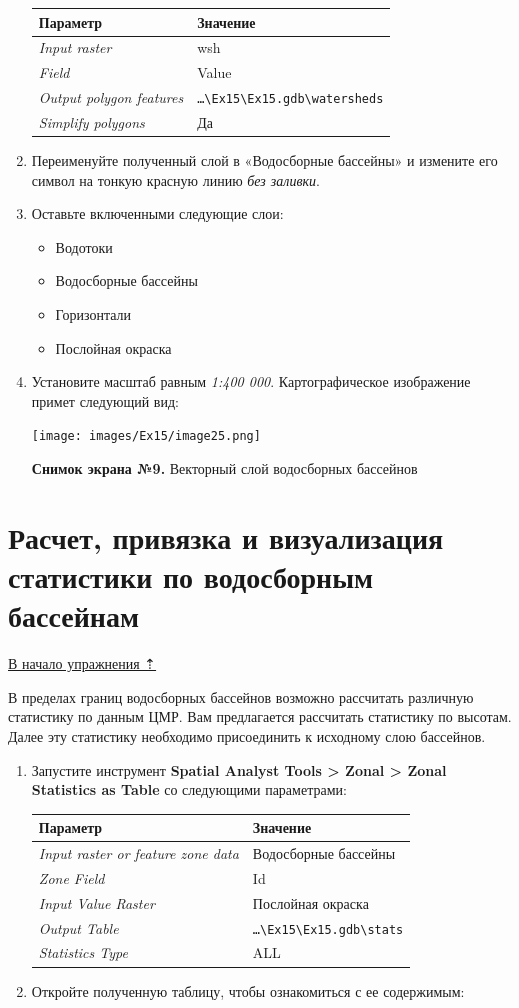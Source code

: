 \documentclass[12pt,]{book}
\providecommand{\tightlist}{%
  \setlength{\itemsep}{0pt}\setlength{\parskip}{0pt}}
\begin{document}
\begin{enumerate}
  \begin{longtable}[]{@{}ll@{}}
  \toprule
  Параметр & Значение\tabularnewline
  \midrule
  \endhead
  \emph{Input raster} & wsh\tabularnewline
  \emph{Field} & Value\tabularnewline
  \emph{Output polygon features} & \texttt{\ldots{}\textbackslash{}Ex15\textbackslash{}Ex15.gdb\textbackslash{}watersheds}\tabularnewline
  \emph{Simplify polygons} & Да\tabularnewline
  \bottomrule
  \end{longtable}
\item
  Переименуйте полученный слой в «Водосборные бассейны» и измените его символ на тонкую красную линию \emph{без заливки}.
\item
  Оставьте включенными следующие слои:

  \begin{itemize}
  \tightlist
  \item
    Водотоки
  \item
    Водосборные бассейны
  \item
    Горизонтали
  \item
    Послойная окраска
  \end{itemize}
\item
  Установите масштаб равным \emph{1:400 000}. Картографическое изображение примет следующий вид:

  \texttt{[image: images/Ex15/image25.png]}

  \textbf{Снимок экрана №9.} Векторный слой водосборных бассейнов
\end{enumerate}

\hypertarget{dem-statistics}{%
\section{Расчет, привязка и визуализация статистики по водосборным бассейнам}\label{dem-statistics}}

\protect\hyperlink{dem}{В начало упражнения ⇡}

В пределах границ водосборных бассейнов возможно рассчитать различную статистику по данным ЦМР. Вам предлагается рассчитать статистику по высотам. Далее эту статистику необходимо присоединить к исходному слою бассейнов.

\begin{enumerate}
\def\labelenumi{\arabic{enumi}.}
\item
  Запустите инструмент \textbf{Spatial Analyst Tools \textgreater{} Zonal \textgreater{} Zonal Statistics as Table} со следующими параметрами:

  \begin{longtable}[]{@{}ll@{}}
  \toprule
  Параметр & Значение\tabularnewline
  \midrule
  \endhead
  \emph{Input raster or feature zone data} & Водосборные бассейны\tabularnewline
  \emph{Zone Field} & Id\tabularnewline
  \emph{Input Value Raster} & Послойная окраска\tabularnewline
  \emph{Output Table} & \texttt{\ldots{}\textbackslash{}Ex15\textbackslash{}Ex15.gdb\textbackslash{}stats}\tabularnewline
  \emph{Statistics Type} & ALL\tabularnewline
  \bottomrule
  \end{longtable}
\item
  Откройте полученную таблицу, чтобы ознакомиться с ее содержимым:
\end{enumerate}
\end{document}
